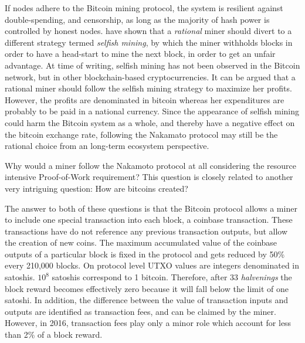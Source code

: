 If nodes adhere to the Bitcoin mining protocol, the system is resilient against double-spending, and censorship, as long as the majority of hash power is controlled by honest nodes. \cite{Eyal2014} have shown that a \emph{rational} miner should divert to a different strategy termed \emph{selfish mining}, by which the miner withholds blocks in order to have a head-start to mine the next block, in order to get an unfair advantage. At time of writing, selfish mining has not been observed in the Bitcoin network, but in other blockchain-based cryptocurrencies. It can be argued that a rational miner should follow the selfish mining strategy to maximize her profits. However, the profits are denominated in bitcoin whereas her expenditures are probably to be paid in a national currency. Since the appearance of selfish mining could harm the Bitcoin system as a whole, and thereby have a negative effect on the bitcoin exchange rate, following the Nakamato protocol may still be the rational choice from an long-term ecosystem perspective. 


Why would a miner follow the Nakamoto protocol at all considering the resource intensive Proof-of-Work requirement? This question is closely related to another very intriguing question: How are bitcoins created?

The answer to both of these questions is that the Bitcoin protocol allows a miner to include one special transaction into each block, a coinbase transaction. These transactions have do not reference any previous transaction outputs, but allow the creation of new coins. The maximum accumulated value of the coinbase outputs of a particular block is fixed in the protocol and gets reduced by 50\% every 210,000 blocks. On protocol level UTXO values are integers denominated in satoshis. $10^8$ satoshis correspond to 1 bitcoin. Therefore, after 33 \emph{halvenings} the block reward becomes effectively zero because it will fall below the limit of one satoshi. In addition, the difference between the value of transaction inputs and outputs are identified as transaction fees, and can be claimed by the miner. However, in 2016, transaction fees play only a minor role which account for less than 2\% of a block reward.

